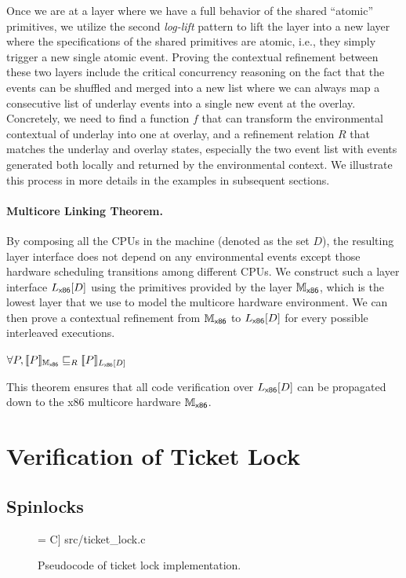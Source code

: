 Once we are at a layer where we have a full behavior of the shared
``atomic'' primitives, we utilize the second \emph{log-lift} pattern to
lift the layer into a new layer where the specifications of the shared
primitives are atomic, i.e., they simply trigger a new single atomic
event. Proving the contextual refinement between these two layers include
the critical concurrency reasoning on the fact that the events can be
shuffled and merged into a new list where we can always map a consecutive
list of underlay events into a single new event at the overlay.
Concretely, we need to find a function $f$ that can transform the environmental
contextual of underlay into one at overlay, and a refinement relation $R$
that matches the underlay and overlay states, especially the two event list
with events generated both locally and returned by the environmental context.
We illustrate this process in more details in the examples in subsequent sections.

\paragraph{Multicore Linking Theorem.}
By composing all the CPUs in the machine (denoted as the set $D$), the resulting 
layer interface does not depend on any environmental events except those
hardware scheduling transitions among different CPUs.
We construct such a layer interface $\PBoot[D]$
using the primitives provided by the layer $\Mach_{\boot}$, which is the lowest
layer that we use to model the multicore hardware environment. 
We can then prove a contextual refinement from  $\Mach_{\boot}$ to $\PBoot[D]$
for every possible interleaved executions.
\begin{theorem}
\label{thm:link}
$\forall P, \sem{\Mach_{\boot}}{P} \refines_R \sem{\PBoot[D]}{P}$
\end{theorem}
This theorem ensures that all code verification over $\PBoot[D]$ can be propagated down to the x86 multicore hardware 
$\Mach_{\boot}$.


\section{Verification of Ticket Lock}
\label{veri-ticket-lock}


\subsection{Spinlocks}

\begin{figure}[t]
 = C] {src/ticket_lock.c}
\caption{Pseudocode of ticket lock implementation.}
\label{fig:ticket_lock_c}
\end{figure}

